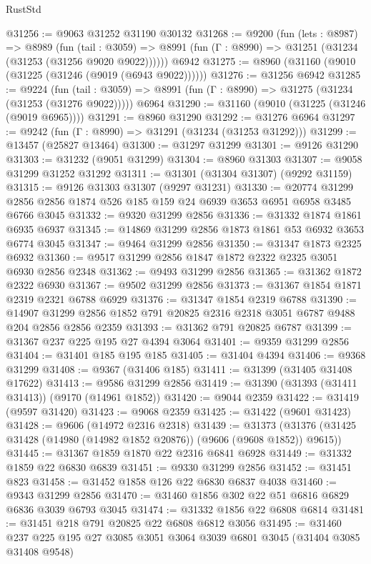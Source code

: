 \begin{lexlean}{RustStd}
\begin{coremodule}
@31256 := @9063 @31252 @31190 @30132
@31268 := @9200
    (fun (lets : @8987) =>
    @8989
      (fun (tail : @3059) =>
      @8991 (fun (Γ : @8990) => @31251 (@31234 (@31253 (@31256 @9020 @9022))))))
    @6942
@31275 := @8960 (@31160 (@9010 (@31225 (@31246 (@9019 (@6943 @9022))))))
@31276 := @31256 @6942
@31285 := @9224
    (fun (tail : @3059) => @8991 (fun (Γ : @8990) => @31275 (@31234 (@31253 (@31276 @9022)))))
    @6964
@31290 := @31160 (@9010 (@31225 (@31246 (@9019 @6965))))
@31291 := @8960 @31290
@31292 := @31276 @6964
@31297 := @9242 (fun (Γ : @8990) => @31291 (@31234 (@31253 @31292)))
@31299 := @13457 (@25827 @13464)
@31300 := @31297 @31299
@31301 := @9126 @31290
@31303 := @31232 (@9051 @31299)
@31304 := @8960 @31303
@31307 := @9058 @31299 @31252 @31292
@31311 := @31301 (@31304 @31307) (@9292 @31159)
@31315 := @9126 @31303 @31307 (@9297 @31231)
@31330 := @20774
    @31299
    @2856
    @2856
    @1874
    @526
    @185
    @159
    @24
    @6939
    @3653
    @6951
    @6958
    @3485
    @6766
    @3045
@31332 := @9320 @31299 @2856
@31336 := @31332 @1874 @1861 @6935 @6937
@31345 := @14869 @31299 @2856 @1873 @1861 @53 @6932 @3653 @6774 @3045
@31347 := @9464 @31299 @2856
@31350 := @31347 @1873 @2325 @6932
@31360 := @9517 @31299 @2856 @1847 @1872 @2322 @2325 @3051 @6930 @2856 @2348
@31362 := @9493 @31299 @2856
@31365 := @31362 @1872 @2322 @6930
@31367 := @9502 @31299 @2856
@31373 := @31367 @1854 @1871 @2319 @2321 @6788 @6929
@31376 := @31347 @1854 @2319 @6788
@31390 := @14907 @31299 @2856 @1852 @791 @20825 @2316 @2318 @3051 @6787 @9488 @204 @2856 @2856 @2359
@31393 := @31362 @791 @20825 @6787
@31399 := @31367 @237 @225 @195 @27 @4394 @3064
@31401 := @9359 @31299 @2856
@31404 := @31401 @185 @195 @185
@31405 := @31404 @4394
@31406 := @9368 @31299
@31408 := @9367 (@31406 @185)
@31411 := @31399 (@31405 @31408 @17622)
@31413 := @9586 @31299 @2856
@31419 := @31390 (@31393 (@31411 @31413)) (@9170 (@14961 @1852))
@31420 := @9044 @2359
@31422 := @31419 (@9597 @31420)
@31423 := @9068 @2359
@31425 := @31422 (@9601 @31423)
@31428 := @9606 (@14972 @2316 @2318)
@31439 := @31373 (@31376 (@31425 @31428 (@14980 (@14982 @1852 @20876)) (@9606 (@9608 @1852)) @9615))
@31445 := @31367 @1859 @1870 @22 @2316 @6841 @6928
@31449 := @31332 @1859 @22 @6830 @6839
@31451 := @9330 @31299 @2856
@31452 := @31451 @823
@31458 := @31452 @1858 @126 @22 @6830 @6837 @4038
@31460 := @9343 @31299 @2856
@31470 := @31460 @1856 @302 @22 @51 @6816 @6829 @6836 @3039 @6793 @3045
@31474 := @31332 @1856 @22 @6808 @6814
@31481 := @31451 @218 @791 @20825 @22 @6808 @6812 @3056
@31495 := @31460 @237 @225 @195 @27 @3085 @3051 @3064 @3039 @6801 @3045 (@31404 @3085 @31408 @9548)

\end{coremodule}
\end{lexlean}
